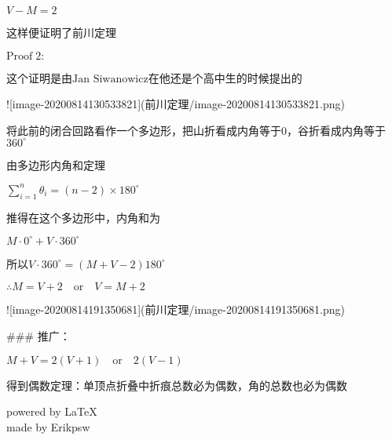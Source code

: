 \documentclass[a4paper,12pt]{article}
\begin{document}
$V − M = 2$

这样便证明了前川定理

$\text{Proof}\;2:$

这个证明是由$\text{Jan Siwanowicz}$在他还是个高中生的时候提出的

![image-20200814130533821](前川定理/image-20200814130533821.png)

将此前的闭合回路看作一个多边形，把山折看成内角等于$0$，谷折看成内角等于$360^{\circ}$

由多边形内角和定理

$\sum\limits_{i=1}^n\theta_i=(n-2)×180^{\circ}$

推得在这个多边形中，内角和为

$M · 0^{\circ} +V · 360^{\circ}$

所以$V · 360^{\circ} = (M +V-2)180^{\circ}$

$\therefore M = V +2 \quad \text{or}\quad V = M + 2$

![image-20200814191350681](前川定理/image-20200814191350681.png)

### 推广：

$M + V = 2(V+1) \quad \text{or} \quad2(V − 1)$

得到偶数定理：单顶点折叠中折痕总数必为偶数，角的总数也必为偶数
\begin{flushright}
    powered by \LaTeX\\
    made by Erikpsw\\ 
\end{flushright}
\end{document}
